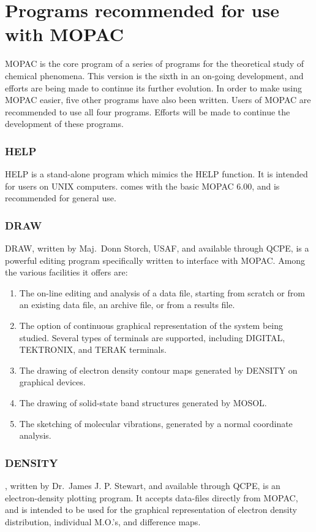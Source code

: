 \section{Programs recommended for use with MOPAC}
   MOPAC is the core program of a series of  programs  for  the  theoretical
   study  of  chemical  phenomena.  This version is the sixth in an on-going
   development,  and  efforts  are  being  made  to  continue  its   further
   evolution.  In order to make using MOPAC easier, five other programs have
   also been written.  Users of  MOPAC  are  recommended  to  use  all  four
   programs.   Efforts  will  be  made  to continue the development of these
   programs.
  
\subsubsection{HELP}
  HELP is a stand-alone program which mimics the    HELP  function.
  It is intended for users on UNIX computers.  comes with the basic
  MOPAC 6.00, and is recommended for general use.

\subsubsection{DRAW}
   DRAW, written by Maj.\ Donn Storch, USAF, 
   and available through QCPE,
   is  a  powerful  editing  program  specifically written to interface with
   MOPAC.  Among the various facilities it offers are:
\begin{enumerate}
\item The on-line editing and analysis of a data file,  starting  from
scratch  or from an existing data file, an archive file, or from
a results file.
\item The option of continuous graphical representation of the  system
being  studied.   Several  types  of  terminals  are  supported,
including DIGITAL, TEKTRONIX, and TERAK terminals.
\item The drawing  of  electron  density  contour  maps  generated  by
DENSITY on graphical devices.
\item The drawing of solid-state band structures generated by MOSOL.
\item The sketching of molecular vibrations,  generated  by  a  normal
coordinate analysis.
\end{enumerate}

\subsubsection{DENSITY}
   , written by Dr.\ James J. P. Stewart, and available  through
   QCPE,  is  an  electron-density  plotting program.  It accepts data-files
   directly from MOPAC, and  is  intended  to  be  used  for  the  graphical
   representation  of  electron density distribution, individual M.O.'s, and
   difference maps.
        
